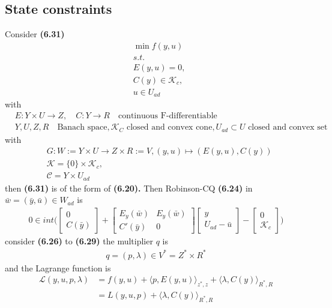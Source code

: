 \subsection{State constraints}
Consider \textbf{(6.31)}
\begin{align*}
	&\min f(y, u) \\
	&s.t.\\
	&E(y, u) = 0,\\
	&C(y) \in \mathcal{K}_c,\\
	&u \in U_{ad}
\end{align*}
with
\begin{align*}
	&E: Y \times U \rightarrow Z,\quad C:Y \rightarrow R \quad \text{continuous F-differentiable}\\
	&Y, U, Z, R \quad \text{Banach space}, \mathcal{K}_C \text{ closed and convex cone}, U_{ad} \subset U \text{ closed and convex set}
\end{align*}
with 
\begin{align*}
	&G:  W := Y \times U \rightarrow  Z \times R := V,
	(y, u) \mapsto (E(y, u), C(y))\\
	&\mathcal{K} = \{0\} \times \mathcal{K}_c,\\
	&\mathcal{C} = Y \times U_{ad}
\end{align*}
then \textbf{(6.31)} is of the form of \textbf{(6.20).} Then Robinson-CQ \textbf{(6.24)} in $\bar{w} = (\bar{y}, \bar{u}) \in W_{ad}$ is 
\begin{align*}
	0 \in int\bigg( 
	\begin{bmatrix}
		0\\
		C(\bar{y})
	\end{bmatrix}
	+ 
	\begin{bmatrix}
		E_y (\bar{w}) & E_y(\bar{w})\\
		C'(\bar{y}) & 0
	\end{bmatrix}
	\begin{bmatrix}
		y\\
		U_{ad} - \bar{u}
	\end{bmatrix}
	 - 
	 \begin{bmatrix}
	 	0\\
	 	\mathcal{K}_c
	 \end{bmatrix} \bigg)
\end{align*}
consider \textbf{(6.26)} to \textbf{(6.29)} the multiplier $q$ is 
\begin{align*}
	q = (p, \lambda) \in V^* = Z^* \times R^*
\end{align*}
and the Lagrange function is 
\begin{align*}
	\mathcal{L}(y, u, p, \lambda) &= f(y, u) + \langle p, E(y, u) \rangle_{z^*, z} + \langle \lambda, C(y) \rangle_{R^*, R}\\
	&= L(y, u, p) + \langle \lambda, C(y) \rangle_{R^*, R}
\end{align*}

